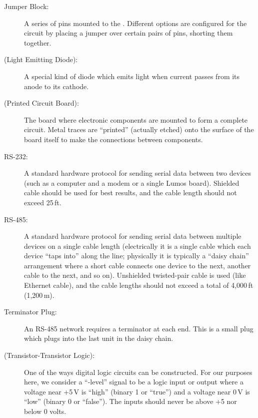 \documentclass[letterpaper,twoside,onecolumn,openright,final]{memoir}
\begin{document}
\begin{description}
	\item[Jumper Block:]
		A series of pins mounted to the .  Different options are configured for the
		circuit by placing a jumper over certain pairs of pins, shorting them together.
	\item[ (Light Emitting Diode):]
		A special kind of diode which emits light when current passes from its anode to its cathode.
	\item[ (Printed Circuit Board):]
		The board where electronic components are mounted to form a complete circuit.  Metal
		traces are ``printed'' (actually etched) onto the surface of the board itself to make the
		connections between components.
	\item[RS-232:]
		A standard hardware protocol for sending serial data between two devices (such as a computer
		and a modem or a single Lumos board).  Shielded cable should be used for best results, and
		the cable length should not exceed 25\,ft.
	\item[RS-485:]
		A standard hardware protocol for sending serial data between multiple devices on a single
		cable length (electrically it is a single cable which each device ``taps into'' along the
		line; physically it is typically a ``daisy chain'' arrangement where a short cable connects
		one device to the next, another cable to the next, and so on). Unshielded twisted-pair cable
		is used (like Ethernet cable), and the cable lengths should not exceed a total of 4,000\,ft
		(1,200\,m).
	\item[Terminator Plug:]
		An RS-485 network requires a terminator at each end.  This is a small plug which plugs into
		the last unit in the daisy chain.
	\item[ (Transistor-Transistor Logic):] One of the ways digital logic circuits can be
		constructed.  For our purposes here, we consider a ``-level'' signal to be a
		logic input or output where a voltage near +5\,V is ``high'' (binary 1 or ``true'') and a
		voltage near 0\,V is ``low'' (binary 0 or ``false'').  The inputs should never be above
		+5 nor below 0 volts.
\end{description}

 

\indexintoc
\printindex
\clearpage


\end{document}
